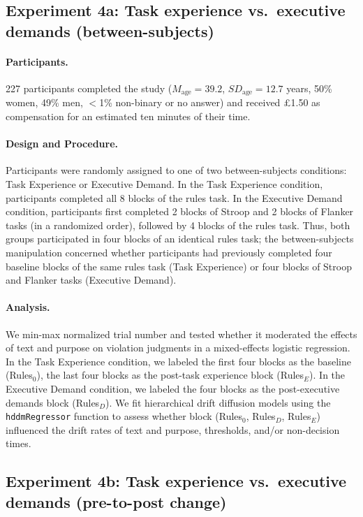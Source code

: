 \documentclass[pdflatex,sn-nature]{sn-jnl}
\begin{document}
\subsection{Experiment 4a: Task experience vs.\ executive demands (between-subjects)}\label{subsec:exp4a}

\paragraph{Participants.}
227 participants completed the study ($M_\text{age} = 39.2$, $\mathit{SD}_\text{age} = 12.7$ years, 50\% women, 49\% men, $<$1\% non-binary or no answer) and received £1.50 as compensation for an estimated ten minutes of their time.

\paragraph{Design and Procedure.}
Participants were randomly assigned to one of two between-subjects conditions: Task Experience or Executive Demand. In the Task Experience condition, participants completed all 8 blocks of the rules task. In the Executive Demand condition, participants first completed 2 blocks of Stroop and 2 blocks of Flanker tasks (in a randomized order), followed by 4 blocks of the rules task. Thus, both groups participated in four blocks of an identical rules task; the between-subjects manipulation concerned whether participants had previously completed four baseline blocks of the same rules task (Task Experience) or four blocks of Stroop and Flanker tasks (Executive Demand).

\paragraph{Analysis.}
We min-max normalized trial number and tested whether it moderated the effects of text and purpose on violation judgments in a mixed-effects logistic regression. In the Task Experience condition, we labeled the first four blocks as the baseline (Rules$_0$), the last four blocks as the post-task experience block (Rules$_E$). In the Executive Demand condition, we labeled the four blocks as the post-executive demands block (Rules$_D$). We fit hierarchical drift diffusion models using the \texttt{hddmRegressor} function to assess whether block (Rules$_0$, Rules$_D$, Rules$_E$) influenced the drift rates of text and purpose, thresholds, and/or non-decision times.

\subsection{Experiment 4b: Task experience vs.\ executive demands (pre-to-post change)}\label{subsec:exp4b}
\end{document}

